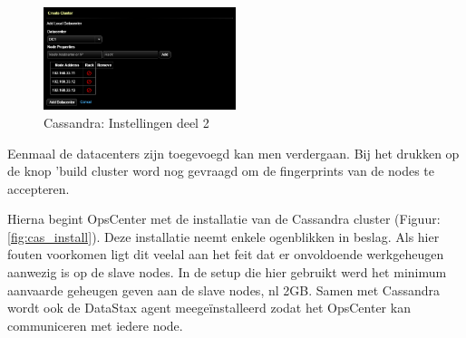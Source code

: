 \begin{figure}[H]
  	\centering
    \includegraphics[width=0.5\textwidth]{img/4_installatie_cassandra/1_Configuration_part_2}
    \caption{Cassandra: Instellingen deel 2}
    \label{fig:cas_conf_2}
\end{figure}

Eenmaal de datacenters zijn toegevoegd kan men verdergaan.
Bij het drukken op de knop 'build cluster word nog gevraagd om de fingerprints van de nodes te accepteren.

Hierna begint OpsCenter met de installatie van de Cassandra cluster (Figuur: \ref{fig:cas_install}).
Deze installatie neemt enkele ogenblikken in beslag.
Als hier fouten voorkomen ligt dit veelal aan het feit dat er onvoldoende werkgeheugen aanwezig is op de slave nodes.
In de setup die hier gebruikt werd het minimum aanvaarde geheugen geven aan de slave nodes, nl 2GB.
Samen met Cassandra wordt ook de DataStax agent meegeïnstalleerd zodat het OpsCenter kan communiceren met iedere node.


